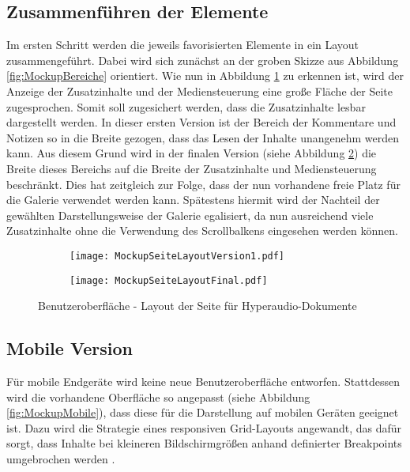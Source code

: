 \subsection{Zusammenführen der Elemente}
Im ersten Schritt werden die jeweils favorisierten Elemente in ein Layout zusammengeführt. Dabei  wird sich zunächst an der groben Skizze aus Abbildung \ref{fig:MockupBereiche} orientiert. Wie nun in Abbildung \ref{fig:MockupSeiteLayoutVersion1} zu erkennen ist, wird der Anzeige der Zusatzinhalte und der Mediensteuerung eine große Fläche der Seite zugesprochen. Somit soll zugesichert werden, dass die Zusatzinhalte lesbar dargestellt werden. In dieser ersten Version ist der Bereich der Kommentare und Notizen so in die Breite gezogen, dass das Lesen der Inhalte unangenehm werden kann. Aus diesem Grund wird in der finalen Version (siehe Abbildung \ref{fig:MockupSeiteLayoutFinal}) die Breite dieses Bereichs auf die Breite der Zusatzinhalte und Mediensteuerung beschränkt. Dies hat zeitgleich zur Folge, dass der nun vorhandene freie Platz für die Galerie verwendet werden kann. Spätestens hiermit wird der Nachteil der gewählten Darstellungsweise der Galerie egalisiert, da nun ausreichend viele Zusatzinhalte ohne die Verwendung des Scrollbalkens eingesehen werden können.

\begin{figure}[h!]
\begin{subfigure}[c]{\textwidth}
\texttt{[image: MockupSeiteLayoutVersion1.pdf]}
\label{fig:MockupSeiteLayoutVersion1}
\end{subfigure}
\par\bigskip
\begin{subfigure}[c]{\textwidth}
\texttt{[image: MockupSeiteLayoutFinal.pdf]}
\label{fig:MockupSeiteLayoutFinal}
\end{subfigure}
\caption{Benutzeroberfläche - Layout der Seite für Hyperaudio-Dokumente}
\label{fig:MockupSeiteLayout}
\end{figure}

\subsection{Mobile Version}
\label{sub:mobile}
Für mobile Endgeräte wird keine neue Benutzeroberfläche entworfen. Stattdessen wird die vorhandene Oberfläche so angepasst (siehe Abbildung \ref{fig:MockupMobile}), dass diese für die Darstellung auf mobilen Geräten geeignet ist. Dazu wird die Strategie eines responsiven Grid-Layouts angewandt, das dafür sorgt, dass Inhalte bei kleineren Bildschirmgrößen anhand definierter Breakpoints umgebrochen werden \citep{hellichtresponsive}.

